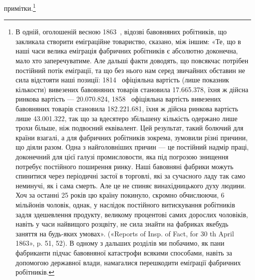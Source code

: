 примітки.\footnote{
В одній, оголошеній весною 1863~, відозві бавовняних робітників,
що закликала створити еміграційне товариство, сказано, між іншим:
«Те, що в наші часи велика еміграція фабричних робітників є абсолютно
доконечна, мало хто заперечуватиме. Але дальші факти доводять, що
повсякчас потрібен постійний потік еміґрації, та що без нього нам серед
звичайних обставин не сила відстояти наші позиції: 1814~ офіціяльна
вартість (лише показник кількости) вивезених бавовняних товарів становила
\num{17.665.378}, їхня ж дійсна ринкова вартість —
\num{20.070.824}, 1858~ офіціяльна вартість вивезених бавовняних
товарів становила \num{182.221.681}, їхня ж дійсна
ринкова вартість лише \num{43.001.322}, так що за вдесятеро
збільшену кількість одержано лише трохи більше, ніж подвоєний еквівалент.
Цей результат, такий болючий для країни взагалі, а для фабричних
робітників зокрема, зумовили різні причини, що діяли разом. Одна
з найголовніших причин — це постійний надмір праці, доконечний для
цієї галузі промисловости, яка під погрозою знищення потребує постійного
поширення ринку. Наші бавовняні фабрики можуть спинитися через
періодичні застої в торговлі, які за сучасного ладу так само неминучі,
як і сама смерть. Але це не спиняє винахідницького духу людини. Хоч
за останні 25 років цю країну покинуло, скромно обчислюючи, 6 мільйонів
чоловік, однак, у наслідок постійного витискування робітників задля
здешевлення продукту, великому процентові самих дорослих чоловіків,
навіть у часи найвищого розцвіту, не сила знайти на фабриках якебудь
заняття на будь-яких умовах». («Reports of Insp. of Fact, for 30 th April
1863», p. 51, 52). В одному з дальших розділів ми побачимо, як пани
фабриканти підчас бавовняної катастрофи всякими способами, навіть за
допомогою державної влади, намагалися перешкодити еміґрації фабричних
робітників.
}
\parbreak{}  %
